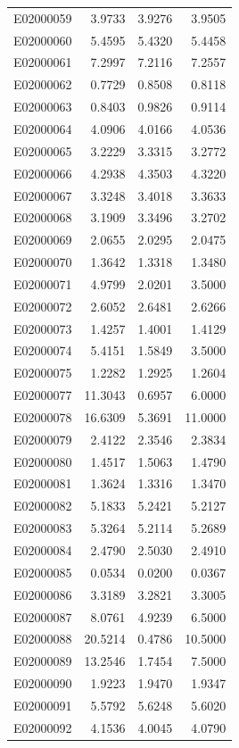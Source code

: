 \documentclass[11pt, a4paper]{article}
\begin{document}
\begin{longtable}{lrrr}
E02000059 & 3.9733 & 3.9276 & 3.9505 \\
E02000060 & 5.4595 & 5.4320 & 5.4458 \\
E02000061 & 7.2997 & 7.2116 & 7.2557 \\
E02000062 & 0.7729 & 0.8508 & 0.8118 \\
E02000063 & 0.8403 & 0.9826 & 0.9114 \\
E02000064 & 4.0906 & 4.0166 & 4.0536 \\
E02000065 & 3.2229 & 3.3315 & 3.2772 \\
E02000066 & 4.2938 & 4.3503 & 4.3220 \\
E02000067 & 3.3248 & 3.4018 & 3.3633 \\
E02000068 & 3.1909 & 3.3496 & 3.2702 \\
E02000069 & 2.0655 & 2.0295 & 2.0475 \\
E02000070 & 1.3642 & 1.3318 & 1.3480 \\
E02000071 & 4.9799 & 2.0201 & 3.5000 \\
E02000072 & 2.6052 & 2.6481 & 2.6266 \\
E02000073 & 1.4257 & 1.4001 & 1.4129 \\
E02000074 & 5.4151 & 1.5849 & 3.5000 \\
E02000075 & 1.2282 & 1.2925 & 1.2604 \\
E02000077 & 11.3043 & 0.6957 & 6.0000 \\
E02000078 & 16.6309 & 5.3691 & 11.0000 \\
E02000079 & 2.4122 & 2.3546 & 2.3834 \\
E02000080 & 1.4517 & 1.5063 & 1.4790 \\
E02000081 & 1.3624 & 1.3316 & 1.3470 \\
E02000082 & 5.1833 & 5.2421 & 5.2127 \\
E02000083 & 5.3264 & 5.2114 & 5.2689 \\
E02000084 & 2.4790 & 2.5030 & 2.4910 \\
E02000085 & 0.0534 & 0.0200 & 0.0367 \\
E02000086 & 3.3189 & 3.2821 & 3.3005 \\
E02000087 & 8.0761 & 4.9239 & 6.5000 \\
E02000088 & 20.5214 & 0.4786 & 10.5000 \\
E02000089 & 13.2546 & 1.7454 & 7.5000 \\
E02000090 & 1.9223 & 1.9470 & 1.9347 \\
E02000091 & 5.5792 & 5.6248 & 5.6020 \\
E02000092 & 4.1536 & 4.0045 & 4.0790 \\

\end{longtable}
\end{document}
